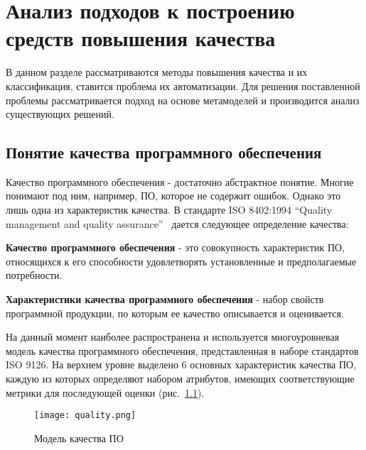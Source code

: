 \chapter{Анализ подходов к построению средств повышения качества}
\label{chap:analisys}

В данном разделе рассматриваются методы повышения качества и их классификация,
ставится проблема их автоматизации. Для решения поставленной проблемы
рассматривается подход на основе метамоделей и производится анализ существующих
решений.

\section{Понятие качества программного обеспечения}
\label{sec:quality}

Качество программного обеспечения - достаточно абстрактное понятие. Многие
понимают под ним, например, ПО, которое не содержит ошибок. Однако это лишь одна
из характеристик качества. В стандарте ISO 8402:1994 ``Quality management and
quality assurance''~\cite{international1994iso} дается следующее определение
качества:

\textbf{Качество программного обеспечения} - это совокупность характеристик ПО,
относящихся к его способности удовлетворять установленные и предполагаемые
потребности.

\textbf{Характеристики качества программного обеспечения} - набор свойств
программной продукции, по которым ее качество описывается и оценивается.

На данный момент наиболее распространена и используется многоуровневая модель
качества программного обеспечения, представленная в наборе стандартов ISO 9126.
На верхнем уровне выделено 6 основных характеристик качества ПО, каждую из
которых определяют набором атрибутов, имеющих соответствующие метрики для
последующей оценки (рис.~\ref{fig:quality_model}).

\newpage
\begin{figure}[h]
    \begin{center}
        \texttt{[image: quality.png]}
    \end{center}
    \caption{Модель качества ПО}
    \label{fig:quality_model}
\end{figure}

